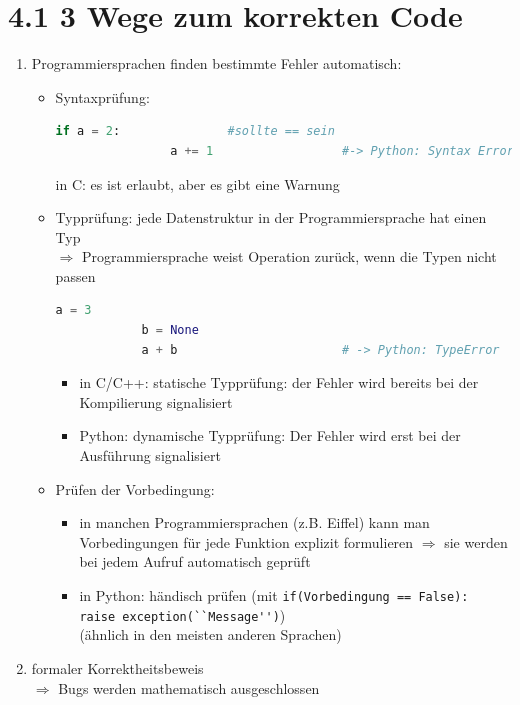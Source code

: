 \documentclass[11pt, fleqn]{scrreprt}
\begin{document}
\section*{4.1 3 Wege zum korrekten Code}
	\begin{enumerate}
		\item Programmiersprachen finden bestimmte Fehler automatisch:
		\begin{itemize}
			\item Syntaxprüfung:
			\begin{lstlisting}[language=Python]
			if a = 2: 				#sollte == sein
				a += 1 					#-> Python: Syntax Error
			\end{lstlisting}
			in C: es ist erlaubt, aber es gibt eine Warnung
			\item Typprüfung: jede Datenstruktur in der Programmiersprache hat einen Typ \\
			$\Rightarrow$ Programmiersprache weist Operation zurück, wenn die Typen nicht passen 
			\begin{lstlisting}[language=Python]
			a = 3
			b = None
			a + b 						# -> Python: TypeError
			\end{lstlisting}
			\begin{itemize}
				\item in C/C++: statische Typprüfung: der Fehler wird bereits bei der Kompilierung signalisiert
				\item Python: dynamische Typprüfung: Der Fehler wird erst bei der Ausführung signalisiert
			\end{itemize}
			\item Prüfen der Vorbedingung: 
			\begin{itemize}
				\item in manchen Programmiersprachen (z.B. Eiffel) kann man Vorbedingungen für jede Funktion explizit formulieren $\Rightarrow$ sie werden bei jedem Aufruf automatisch geprüft
				\item in Python: händisch prüfen (mit \verb|if(Vorbedingung == False): |\\ \verb|raise exception(``Message'')|)\\
				(ähnlich in den meisten anderen Sprachen)
			\end{itemize}
		\end{itemize}
		\item formaler Korrektheitsbeweis \\
		$\Rightarrow$ Bugs werden mathematisch ausgeschlossen \\

\end{enumerate}
\end{document}
